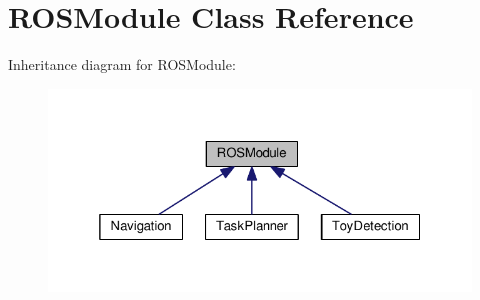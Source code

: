 \hypertarget{classROSModule}{}\section{R\+O\+S\+Module Class Reference}
\label{classROSModule}


Inheritance diagram for R\+O\+S\+Module\+:
\nopagebreak
\begin{figure}[H]
\begin{center}
\leavevmode
\includegraphics[width=325pt]{classROSModule__inherit__graph}
\end{center}
\end{figure}
